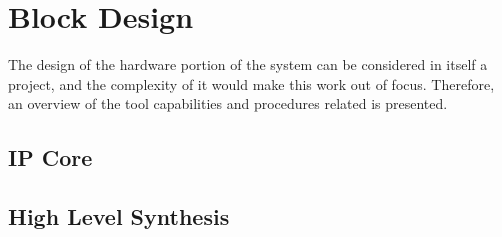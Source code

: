\section{Block Design}

The design of the hardware portion of the system can be considered in itself a project, and the complexity of it would make this work out of focus. Therefore, an overview of the tool capabilities and procedures related is presented.




\subsection{IP Core}

\subsection{High Level Synthesis}

